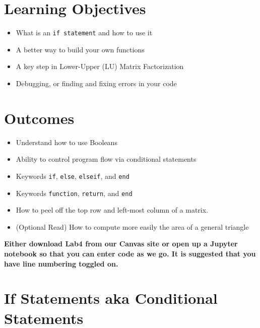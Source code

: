 \section*{Learning Objectives}

\begin{itemize}
\item  What is an \texttt{if\,statement} and how to use it
\item A better way to build your own functions
\item A key step in Lower-Upper (LU) Matrix Factorization
\item Debugging, or finding and fixing errors in your code
\end{itemize}

\section*{Outcomes} 
\begin{itemize}
\item Understand how to use Booleans
\item Ability to control program flow via conditional statements
\item Keywords \texttt{if}, \texttt{else}, \texttt{elseif}, and \texttt{end} 
\item Keywords \texttt{function}, \texttt{return}, and \texttt{end} 
\item How to peel off the top row and left-most column of a matrix.
\item (Optional Read) How to compute more easily the area of a general triangle 

\end{itemize}

\vspace*{1cm}

\textbf{Either download Lab4 from our Canvas site or open up a Jupyter notebook so that you can enter code as we go. It is suggested that you have line numbering toggled on.}  

\newpage

\section{If Statements aka Conditional Statements}

